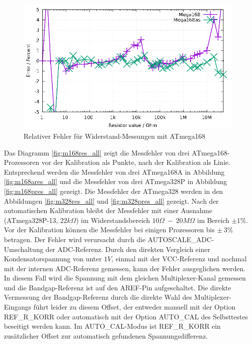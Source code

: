 \begin{figure}[H]
\centering
\includegraphics[width=16cm]{../GNU/Mega168res.pdf}
\caption{Relativer Fehler für Widerstand-Messungen mit ATmega168 }
\label{fig:mega168res}
\end{figure}

Das Diagramm \ref{fig:m168res_all} zeigt die Messfehler von drei ATmega168-Prozessoren vor der Kalibration als Punkte, nach der
Kalibration als Linie. Entsprechend werden die Messfehler von drei ATmega168A in Abbildung \ref{fig:m168ares_all} und
die Messfehler von drei ATmega328P in Abbildung \ref{fig:m168pres_all} gezeigt.
Die Messfehler der ATmega328 werden in den Abbildungen \ref{fig:m328res_all} und \ref{fig:m328pres_all} gezeigt.
Nach der automatischen Kalibration bleibt der Messfehler mit einer Ausnahme (ATmega328P-13, \(22k\Omega\)) im Widerstandsbereich
\(10\Omega~-~20M\Omega\) im Bereich \(\pm1\%\).
Vor der Kalibration können die Messfehler bei einigen Prozessoren bis \(\pm~3\%\) betragen.
Der Fehler wird verursacht durch die AUTOSCALE\_ADC-Umschaltung der ADC-Referenz.
Durch den direkten Vergleich einer Kondensatorspannung von unter \(1V\), einmal mit der VCC-Referenz und nochmal mit
der internen ADC-Referenz gemessen, kann der Fehler ausgeglichen werden.
In diesem Fall wird die Spannung mit dem gleichen Multiplexer-Kanal gemessen und die Bandgap-Referenz ist auf den AREF-Pin
aufgeschaltet.
Die direkte Vermessung der Bandgap-Referenz durch die direkte Wahl des Multiplexer-Eingangs führt leider zu diesem Offset,
der entweder manuell mit der Option REF\_R\_KORR oder automatisch mit der Option AUTO\_CAL des Selbsttestes beseitigt werden kann.
Im AUTO\_CAL-Modus ist REF\_R\_KORR ein zusätzlicher Offset zur automatisch gefundenen Spannungsdifferenz.

